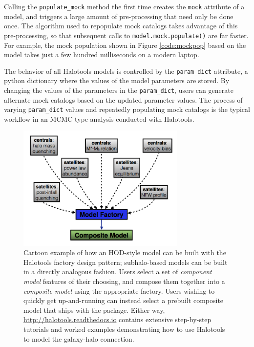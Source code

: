 \documentclass[twocolumn, tighten]{aastex6}
\begin{document}
Calling the {\tt populate\_mock} method the first time creates the {\tt mock} attribute of a model, and triggers a large amount of pre-processing that need only be done once. The algorithm used to repopulate mock catalogs takes advantage of this pre-processing, so that subsequent calls to {\tt model.mock.populate()} are far faster. For example, the mock population shown in Figure \ref{code:mockpop} based on the \citet{leauthaud11b} model takes just a few hundred milliseconds on a modern laptop. 

The behavior of all Halotools models is controlled by the {\tt param\_dict} attribute, a python dictionary where the values of the model parameters are stored. By changing the values of the parameters in the {\tt param\_dict}, users can generate alternate mock catalogs based on the updated parameter values. The process of varying {\tt param\_dict} values and repeatedly populating mock catalogs is the typical workflow in an MCMC-type analysis conducted with Halotools. 

\begin{figure}
\begin{center}
\includegraphics[width=8.3cm]{./FIGS/halotools_design.png}
\caption{
Cartoon example of how an HOD-style model can be built with the Halotools factory design pattern; subhalo-based models can be built in a directly analogous fashion. Users select a set of {\em component model} features of their choosing, and compose them together into a {\em composite model} using the appropriate factory. Users wishing to quickly get up-and-running can instead select a prebuilt composite model that ships with the package. Either way, \url{http://halotools.readthedocs.io} contains extensive step-by-step tutorials and worked examples demonstrating how to use Halotools to model the galaxy-halo connection. 
}
\label{fig:modeling}
\end{center}
\end{figure}
\end{document}
